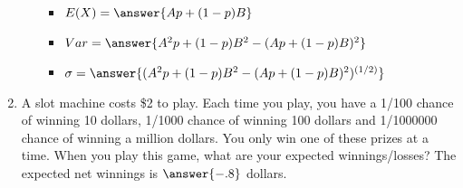 \documentclass{ximera}
\begin{document}
\begin{enumerate}
\begin{enumerate}
\begin{itemize}
\item $E(X)=\answer{Ap+(1-p)B}$
\item $Var=\answer{A^2p+(1-p)B^2-(Ap+(1-p)B)^2}$
\item $\sigma=\answer{(A^2p+(1-p)B^2-(Ap+(1-p)B)^2)^{(1/2)}}$
\end{itemize}




\end{enumerate}
\item A slot machine costs \$2 to play.  Each time you play, you have a 1/100 chance of winning 10 dollars, 1/1000 chance of winning 100 dollars and 1/1000000 chance of winning a million dollars.  You only win one of these prizes at a time.  When you play this game, what are your expected winnings/losses? The expected net winnings is $\answer{-.8}$ dollars.






\end{enumerate}
\end{document}
